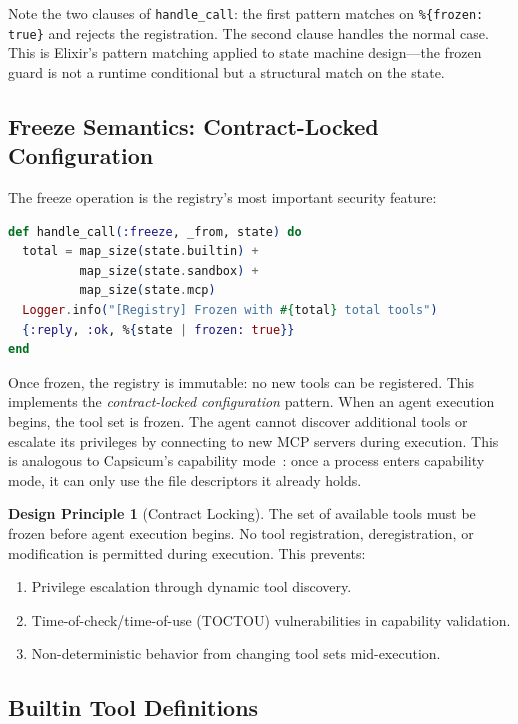 \documentclass[12pt,a4paper]{article}
\theoremstyle{plain}
\theoremstyle{definition}
\newtheorem{designprinciple}[theorem]{Design Principle}
\begin{document}
Note the two clauses of \texttt{handle\_call}: the first pattern matches on \texttt{\%\{frozen: true\}} and rejects the registration. The second clause handles the normal case. This is Elixir's pattern matching applied to state machine design---the frozen guard is not a runtime conditional but a structural match on the state.

\subsection{Freeze Semantics: Contract-Locked Configuration}

The freeze operation is the registry's most important security feature:

\begin{lstlisting}[language=elixir, caption={Registry freeze operation.}, label={lst:freeze}]
def handle_call(:freeze, _from, state) do
  total = map_size(state.builtin) +
          map_size(state.sandbox) +
          map_size(state.mcp)
  Logger.info("[Registry] Frozen with #{total} total tools")
  {:reply, :ok, %{state | frozen: true}}
end
\end{lstlisting}

Once frozen, the registry is immutable: no new tools can be registered. This implements the \emph{contract-locked configuration} pattern. When an agent execution begins, the tool set is frozen. The agent cannot discover additional tools or escalate its privileges by connecting to new MCP servers during execution. This is analogous to Capsicum's capability mode~\citep{watson2010capsicum}: once a process enters capability mode, it can only use the file descriptors it already holds.

\begin{designprinciple}[Contract Locking]
\label{dp:freeze}
The set of available tools must be frozen before agent execution begins. No tool registration, deregistration, or modification is permitted during execution. This prevents:
\begin{enumerate}
\item Privilege escalation through dynamic tool discovery.
\item Time-of-check/time-of-use (TOCTOU) vulnerabilities in capability validation.
\item Non-deterministic behavior from changing tool sets mid-execution.
\end{enumerate}
\end{designprinciple}

\subsection{Builtin Tool Definitions}
\end{document}
